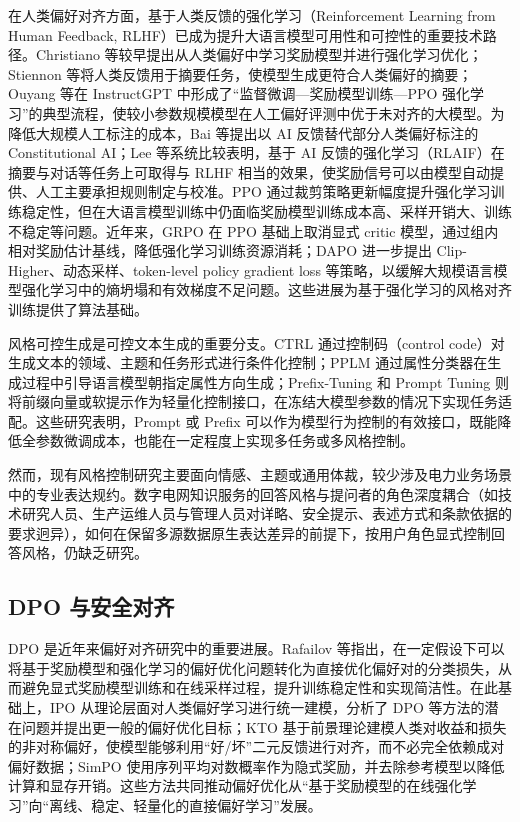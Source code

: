 \documentclass[fontset=fandol,type=master,campus=shenzhen,etitleauto=true]{hithesisbook}
\begin{document}
在人类偏好对齐方面，基于人类反馈的强化学习（Reinforcement Learning from Human Feedback, RLHF）已成为提升大语言模型可用性和可控性的重要技术路径。Christiano 等较早提出从人类偏好中学习奖励模型并进行强化学习优化\cite{ref30}；Stiennon 等将人类反馈用于摘要任务，使模型生成更符合人类偏好的摘要\cite{ref31}；Ouyang 等在 InstructGPT 中形成了“监督微调—奖励模型训练—PPO 强化学习”的典型流程，使较小参数规模模型在人工偏好评测中优于未对齐的大模型\cite{ref32}。为降低大规模人工标注的成本，Bai 等提出以 AI 反馈替代部分人类偏好标注的 Constitutional AI\cite{ref44}；Lee 等系统比较表明，基于 AI 反馈的强化学习（RLAIF）在摘要与对话等任务上可取得与 RLHF 相当的效果\cite{ref90}，使奖励信号可以由模型自动提供、人工主要承担规则制定与校准。PPO 通过裁剪策略更新幅度提升强化学习训练稳定性\cite{ref33}，但在大语言模型训练中仍面临奖励模型训练成本高、采样开销大、训练不稳定等问题。近年来，GRPO 在 PPO 基础上取消显式 critic 模型，通过组内相对奖励估计基线，降低强化学习训练资源消耗\cite{ref34}；DAPO 进一步提出 Clip-Higher、动态采样、token-level policy gradient loss 等策略，以缓解大规模语言模型强化学习中的熵坍塌和有效梯度不足问题\cite{ref35}。这些进展为基于强化学习的风格对齐训练提供了算法基础。

风格可控生成是可控文本生成的重要分支。CTRL 通过控制码（control code）对生成文本的领域、主题和任务形式进行条件化控制\cite{ref36}；PPLM 通过属性分类器在生成过程中引导语言模型朝指定属性方向生成\cite{ref37}；Prefix-Tuning 和 Prompt Tuning 则将前缀向量或软提示作为轻量化控制接口，在冻结大模型参数的情况下实现任务适配\cite{ref38,ref39}。这些研究表明，Prompt 或 Prefix 可以作为模型行为控制的有效接口，既能降低全参数微调成本，也能在一定程度上实现多任务或多风格控制。

然而，现有风格控制研究主要面向情感、主题或通用体裁，较少涉及电力业务场景中的专业表达规约。数字电网知识服务的回答风格与提问者的角色深度耦合（如技术研究人员、生产运维人员与管理人员对详略、安全提示、表述方式和条款依据的要求迥异），如何在保留多源数据原生表达差异的前提下，按用户角色显式控制回答风格，仍缺乏研究。

\subsection{DPO 与安全对齐}

DPO 是近年来偏好对齐研究中的重要进展。Rafailov 等指出，在一定假设下可以将基于奖励模型和强化学习的偏好优化问题转化为直接优化偏好对的分类损失，从而避免显式奖励模型训练和在线采样过程，提升训练稳定性和实现简洁性\cite{ref40}。在此基础上，IPO 从理论层面对人类偏好学习进行统一建模，分析了 DPO 等方法的潜在问题并提出更一般的偏好优化目标\cite{ref41}；KTO 基于前景理论建模人类对收益和损失的非对称偏好，使模型能够利用“好/坏”二元反馈进行对齐，而不必完全依赖成对偏好数据\cite{ref42}；SimPO 使用序列平均对数概率作为隐式奖励，并去除参考模型以降低计算和显存开销\cite{ref43}。这些方法共同推动偏好优化从“基于奖励模型的在线强化学习”向“离线、稳定、轻量化的直接偏好学习”发展。
\end{document}
